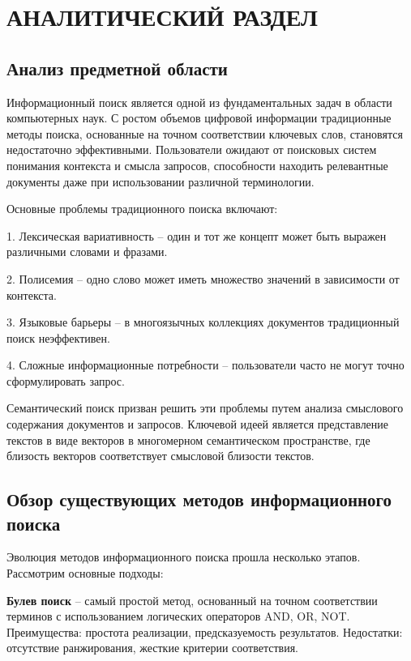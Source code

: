 
	
	\chapter{АНАЛИТИЧЕСКИЙ РАЗДЕЛ}
	
	\section{Анализ предметной области}
	
	\justifying
	
	Информационный поиск является одной из фундаментальных задач в области компьютерных наук. С ростом объемов цифровой информации традиционные методы поиска, основанные на точном соответствии ключевых слов, становятся недостаточно эффективными. Пользователи ожидают от поисковых систем понимания контекста и смысла запросов, способности находить релевантные документы даже при использовании различной терминологии.
	
	Основные проблемы традиционного поиска включают:
	
	1. Лексическая вариативность – один и тот же концепт может быть выражен различными словами и фразами.
	
	2. Полисемия – одно слово может иметь множество значений в зависимости от контекста.
	
	3. Языковые барьеры – в многоязычных коллекциях документов традиционный поиск неэффективен.
	
	4. Сложные информационные потребности – пользователи часто не могут точно сформулировать запрос.
	
	Семантический поиск призван решить эти проблемы путем анализа смыслового содержания документов и запросов. Ключевой идеей является представление текстов в виде векторов в многомерном семантическом пространстве, где близость векторов соответствует смысловой близости текстов.
	
	\section{Обзор существующих методов информационного поиска}
	
	Эволюция методов информационного поиска прошла несколько этапов. Рассмотрим основные подходы:
	
	\textbf{Булев поиск} – самый простой метод, основанный на точном соответствии терминов с использованием логических операторов AND, OR, NOT. Преимущества: простота реализации, предсказуемость результатов. Недостатки: отсутствие ранжирования, жесткие критерии соответствия.
	
